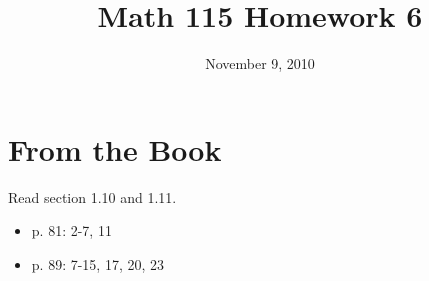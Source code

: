 \documentclass[fleqn,addpoints]{exam}
\title{Math 115 Homework 6}
\date{November 9, 2010}
\begin{document}
\maketitle
 
\section{From the Book}

\vspace{0.2 cm} 

Read section 1.10 and 1.11.
 
\begin{itemize}
  \item p. 81: 2-7, 11
  \item p. 89: 7-15, 17, 20, 23
\end{itemize}
\end{document}
